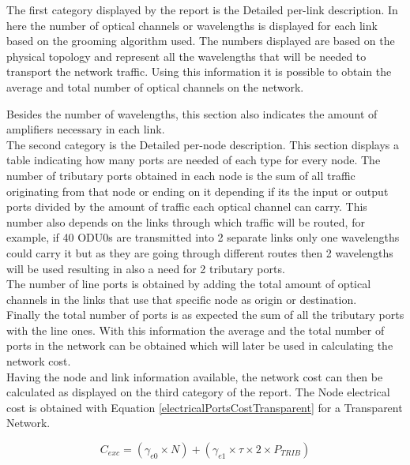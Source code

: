 	The first category displayed by the report is the Detailed per-link description. In here the number of optical channels or wavelengths is displayed for each link based on the grooming algorithm used. The numbers displayed are based on the physical topology and represent all the wavelengths that will be needed to transport the network traffic. Using this information it is possible to obtain the average and total number of optical channels on the network.
	
	Besides the number of wavelengths, this section also indicates the amount of amplifiers necessary in each link. \\
	
	The second category is the Detailed per-node description. This section displays a table indicating how many ports are needed of each type for every node. The number of tributary ports obtained in each node is the sum of all traffic originating from that node or ending on it depending if its the input or output ports divided by the amount of traffic each optical channel can carry. This number also depends on the links through which traffic will be routed, for example, if 40 ODU0s are transmitted into 2 separate links only one wavelengths could carry it but as they are going through different routes then 2 wavelengths will be used resulting in also a need for 2 tributary ports.\\
	
	The number of line ports is obtained by adding the total amount of optical channels in the links that use that specific node as origin or destination.\\
	
	Finally the total number of ports is as expected the sum of all the tributary ports with the line ones. With this information the average and the total number of ports in the network can be obtained which will later be used in calculating the network cost.\\
	
	Having the node and link information available, the network cost can then be calculated as displayed on the third category of the report.								
	The Node electrical cost is obtained with Equation \ref{electricalPortsCostTransparent} for a Transparent Network.
	
	\begin{equation}
		C_{exc} = \left(\gamma_{e0}\times N\right) + \left(\gamma_{e1} \times \tau \times 2 \times P_{TRIB}\right)
		\label{electricalPortsCostTransparent}
	\end{equation}
	
